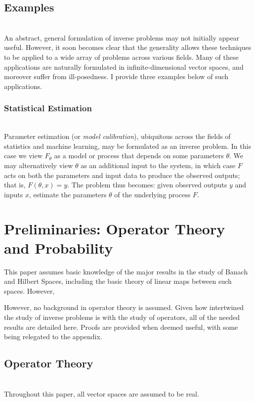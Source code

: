 \documentclass[12pt]{amsart}
\begin{document}
 \subsection{Examples} \hfill \\
 An abstract, general formulation of inverse problems may not initially appear useful. However, it soon becomes clear that the generality allows these techniques to be applied to a wide array of problems across various fields. Many of these applications are naturally formulated in infinite-dimensional vector spaces, and moreover suffer from ill-posedness. I provide three examples below of such applications. 
 
 \subsubsection{Statistical Estimation} \hfill \\
 Parameter estimation (or \textit{model calibration}), ubiquitous across the fields of statistics and machine learning, may be formulated as an inverse problem. In this case we view $F_\theta$ as a model or process that depends on some parameters $\theta$. We may alternatively view $\theta$ as an additional input to the system, in which case $F$ acts on both the parameters and input data to produce the observed outputs; that is, $F(\theta, x) = y$. The problem thus becomes: given observed outputs $y$ and inputs $x$, estimate the parameters $\theta$ of the underlying process $F$. 
 
 \section{Preliminaries: Operator Theory and Probability}
 This paper assumes basic knowledge of the major results in the study of Banach and Hilbert Spaces, including the basic theory of linear maps between such spaces. However, 
 
 
 However, no background in operator theory is assumed. Given how intertwined the study of inverse problems is with the study of operators, all of the needed results are detailed here. Proofs are provided when deemed useful, with some being relegated to the appendix. 
 
 \subsection{Operator Theory} \hfill \\
 Throughout this paper, all vector spaces are assumed to be real. 
 
\end{document}
